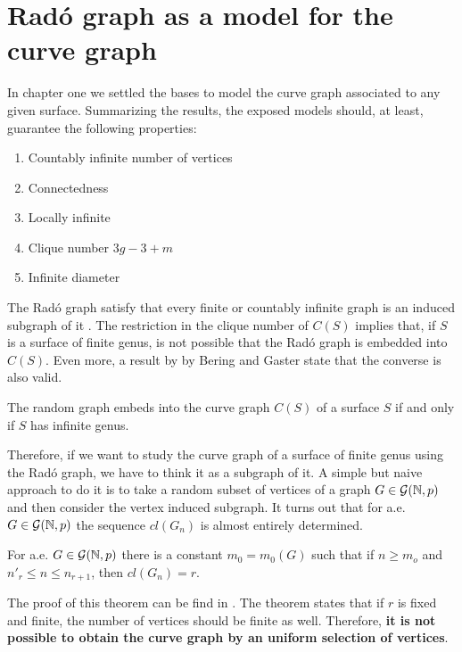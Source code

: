 \section{Radó graph as a model for the curve graph}

In chapter one we settled the bases to model the curve graph associated to any given surface. Summarizing the results, the exposed models should, at least, guarantee the following properties:

\begin{enumerate}
\item Countably infinite number of vertices
\item Connectedness
\item Locally infinite
\item Clique number $3g-3+m$
\item Infinite diameter
\end{enumerate}

The Radó graph satisfy that every finite or countably infinite graph is an induced subgraph of it \cite{DarReferenciaAqui1}. The restriction in the clique number of $C(S)$ implies that, if $S$ is a surface of finite genus, is not possible that the Radó graph is embedded into $C(S)$. Even more, a result by by Bering and Gaster \cite{beringGaster} state that the converse is also valid.

\begin{theorem}
The random graph embeds into the curve graph $C(S)$ of a surface $S$ if and only if $S$ has infinite genus.
\end{theorem}

Therefore, if we want to study the curve graph of a surface of finite genus using the Radó graph, we have to think it as a subgraph of it. A simple but naive approach to do it is to take a random subset of vertices of a graph $G\in \mathcal{G}(\mathbb{N}, p)$ and then consider the vertex induced subgraph. It turns out that for a.e. $G\in \mathcal{G}(\mathbb{N}, p)$ the sequence $cl(G_n)$ is almost entirely determined.

\begin{theorem}
For a.e. $G \in \mathcal{G}(\mathbb{N},p)$ there is a constant $m_0 = m_{0}(G)$ such that if $n \geq m_o$ and $n'_{r} \leq n \leq n_{r+1}$, then $cl(G_{n}) = r$.
\end{theorem}

The proof of this theorem can be find in \cite[Bollobás p.~284]{Bollobas}. The theorem states that if $r$ is fixed and finite, the number of vertices should be finite as well. Therefore, \textbf{it is not possible to obtain the curve graph by an uniform selection of vertices}. 

